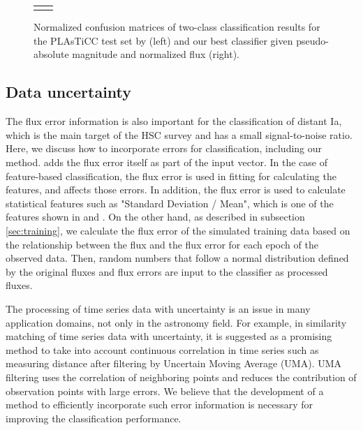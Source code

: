 \documentclass[useamsfonts]{pasj01}
\begin{document}
\begin{figure}[htbp]
\begin{tabular}{cc}
\begin{minipage}{0.5\hsize}
\begin{center}
            \end{center}
        \end{minipage}
    \end{tabular}  \caption{%
    Normalized confusion matrices of two-class classification results for the PLAsTiCC test set by \citet{boone19a} (left) and our best classifier given pseudo-absolute magnitude and normalized flux (right).
    }%
    \label{fig:comp_plasticc_1st}
\end{figure}
%
%
%
%
\subsection{Data uncertainty}
%
The flux error information is also important for the classification of distant Ia, which is the main target of the HSC survey and has a small signal-to-noise ratio.
Here, we discuss how to incorporate errors for classification, including our method.
\citet{charnock17a} adds the flux error itself as part of the input vector.
In the case of feature-based classification, the flux error is used in fitting for calculating the features, and affects those errors.
In addition, the flux error is used to calculate statistical features such as "Standard Deviation / Mean", which is one of the features shown in \citet{narayan18a} and \citet{Muthukrishna_2019}.
On the other hand, as described in subsection \ref{sec:training}, we calculate the flux error of the simulated training data based on the relationship between the flux and the flux error for each epoch of the observed data.
Then, random numbers that follow a normal distribution defined by the original fluxes and flux errors are input to the classifier as processed fluxes.

The processing of time series data with uncertainty is an issue in many application domains, not only in the astronomy field.
For example, in similarity matching of time series data with uncertainty, it is suggested as a promising method to take into account continuous correlation in time series such as measuring distance after filtering by Uncertain Moving Average (UMA)\citep{Dallachiesa_2012}.
UMA filtering uses the correlation of neighboring points and reduces the contribution of observation points with large errors.
We believe that the development of a method to efficiently incorporate such error information is necessary for improving the classification performance.
%
\end{document}
